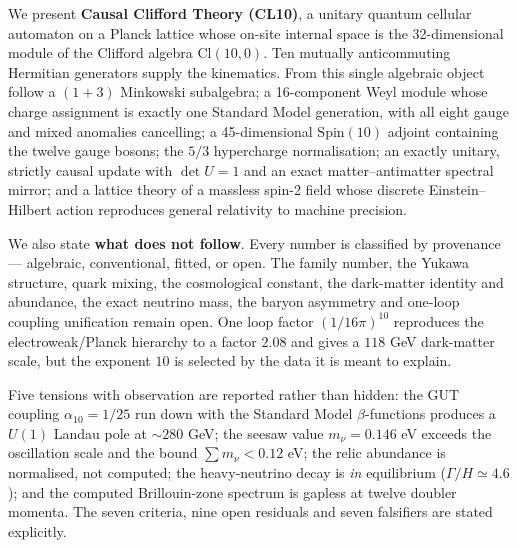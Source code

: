 We present \textbf{Causal Clifford Theory (CL10)}, a unitary quantum cellular
automaton on a Planck lattice whose on-site internal space is the
32-dimensional module of the Clifford algebra $\mathrm{Cl}(10,0)$. Ten
mutually anticommuting Hermitian generators supply the kinematics. From this
single algebraic object follow a $(1{+}3)$ Minkowski subalgebra; a
16-component Weyl module whose charge assignment is exactly one Standard
Model generation, with all eight gauge and mixed anomalies cancelling; a
45-dimensional $\mathrm{Spin}(10)$ adjoint containing the twelve gauge
bosons; the $5/3$ hypercharge normalisation; an exactly unitary, strictly
causal update with $\det U = 1$ and an exact matter--antimatter spectral
mirror; and a lattice theory of a massless spin-2 field whose discrete
Einstein--Hilbert action reproduces general relativity to machine precision.

We also state \textbf{what does not follow}. Every number is classified by
provenance --- algebraic, conventional, fitted, or open. The family number,
the Yukawa structure, quark mixing, the cosmological constant, the
dark-matter identity and abundance, the exact neutrino mass, the baryon
asymmetry and one-loop coupling unification remain open. One loop factor
$(1/16\pi)^{10}$ reproduces the electroweak/Planck hierarchy to a factor
$2.08$ and gives a $118$ GeV dark-matter scale, but the exponent $10$ is
selected by the data it is meant to explain.

Five tensions with observation are reported rather than hidden: the GUT
coupling $\alpha_{10} = 1/25$ run down with the Standard Model
$\beta$-functions produces a $U(1)$ Landau pole at $\sim 280$ GeV; the
seesaw value $m_\nu = 0.146$ eV exceeds the oscillation scale and the bound
$\sum m_\nu < 0.12$ eV; the relic abundance is normalised, not computed; the
heavy-neutrino decay is \emph{in} equilibrium ($\Gamma/H \simeq 4.6$); and
the computed Brillouin-zone spectrum is gapless at twelve doubler momenta.
The seven criteria, nine open residuals and seven falsifiers are stated
explicitly.
